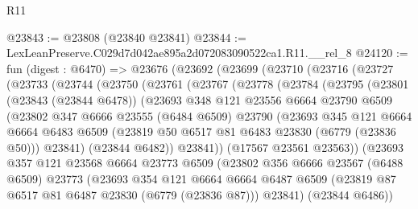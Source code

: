 \begin{lexlean}{R11}
\begin{coremodule}
@23843 := @23808 (@23840 @23841)
@23844 := LexLeanPreserve.C029d7d042ae895a2d072083090522ca1.R11.__rel_8
@24120 := fun (digest : @6470) =>
  @23676
    (@23692
      (@23699
        (@23710
          (@23716
            (@23727
              (@23733
                (@23744
                  (@23750
                    (@23761
                      (@23767
                        (@23778
                          (@23784
                            (@23795
                              (@23801
                                (@23843 (@23844 @6478))
                                (@23693
                                  @348
                                  @121
                                  @23556
                                  @6664
                                  @23790
                                  @6509
                                  (@23802
                                    @347
                                    @6666
                                    @23555
                                    (@6484 @6509)
                                    @23790
                                    (@23693
                                      @345
                                      @121
                                      @6664
                                      @6664
                                      @6483
                                      @6509
                                      (@23819 @50 @6517 @81 @6483 @23830 (@6779 (@23836 @50)))
                                      @23841)
                                    (@23844 @6482))
                                  @23841))
                              (@17567 @23561 @23563))
                            (@23693
                              @357
                              @121
                              @23568
                              @6664
                              @23773
                              @6509
                              (@23802
                                @356
                                @6666
                                @23567
                                (@6488 @6509)
                                @23773
                                (@23693
                                  @354
                                  @121
                                  @6664
                                  @6664
                                  @6487
                                  @6509
                                  (@23819 @87 @6517 @81 @6487 @23830 (@6779 (@23836 @87)))
                                  @23841)
                                (@23844 @6486))

\end{coremodule}
\end{lexlean}
